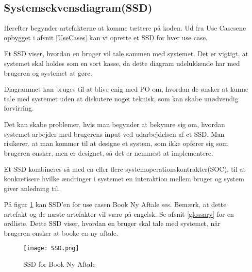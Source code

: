 \subsection{Systemsekvensdiagram(SSD)}

Herefter begynder artefakterne at komme tættere på koden.
Ud fra Use Casesene opbygget i afsnit \ref{UseCases} kan vi oprette et SSD for hver use case.

Et SSD viser, hvordan en bruger vil tale sammen med systemet.
Det er vigtigt, at systemet skal holdes som en sort kasse, da dette diagram udelukkende har med brugeren og systemet at gøre.

Diagrammet kan bruges til at blive enig med PO om, hvordan de ønsker at kunne tale med systemet uden at diskutere noget teknisk, som kan skabe unødvendig forvirring.

Det kan skabe problemer, hvis man begynder at bekymre sig om, hvordan systemet arbejder med brugerens input ved udarbejdelsen af et SSD.
Man risikerer, at man kommer til at designe et system, som ikke opfører sig som brugeren ønsker, men er designet, så det er nemmest at implementere.

Et SSD kombineres så med en eller flere systemoperationskontrakter(SOC), til at konkretisere hvilke ændringer i systemet en interaktion mellem bruger og system giver anledning til.

På figur \ref{forretning:ssd} kan SSD'en for use casen Book Ny Aftale ses.
Bemærk, at dette artefakt og de næste artefakter vil være på engelsk.
Se afsnit \ref{glossary} for en ordliste.
Dette SSD viser, hvordan en bruger skal tale med systemet, når brugeren ønsker at booke en ny aftale.

\begin{figure}[H]
    \caption{SSD for Book Ny Aftale}
    \centering
        \texttt{[image: SSD.png]}
    \label{forretning:ssd}
\end{figure}
